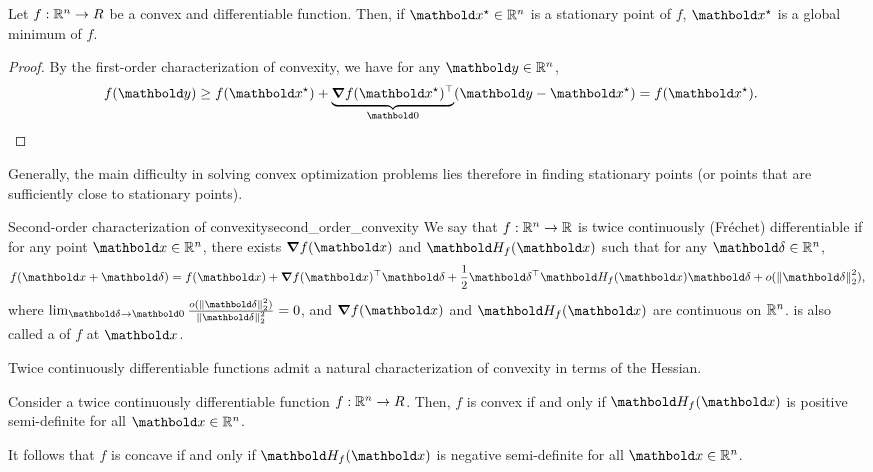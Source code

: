\begin{thmb}
  \begin{thm}
    Let $f : \mathbb{R}^n \to R$ be a convex and differentiable function.
    Then, if $\vxs \in \R^n$ is a stationary point of $f$, $\vxs$ is a global minimum of $f$.
  \end{thm}
\end{thmb}
\begin{proof}
  By the first-order characterization of convexity, we have for any $\vy \in \R^n$, \begin{align*}
    f(\vy) \geq f(\vxs) + \underbrace{\transpose{\grad f(\vxs)}}_{\vzero}(\vy - \vxs) = f(\vxs). &\qedhere
  \end{align*}
\end{proof}

Generally, the main difficulty in solving convex optimization problems lies therefore in finding stationary points (or points that are sufficiently close to stationary points).

\begin{rmk}{Second-order characterization of convexity}{second_order_convexity}
  We say that $f : \mathbb{R}^n \to \mathbb{R}$ is twice continuously (Fréchet) differentiable if for any point $\vx \in \R^n$, there exists $\grad f(\vx)$ and $\hes_f(\vx)$ such that for any $\vdelta \in \R^n$, \begin{align}
    f(\vx + \vdelta) = f(\vx) + \transpose{\grad f(\vx)}\vdelta + \frac{1}{2}\transpose{\vdelta}\hes_f(\vx)\vdelta + o(\norm{\vdelta}^2_2), \label{eq:second_order_exp}
  \end{align} where $\lim_{\vdelta \to \vzero} \frac{o(\norm{\vdelta}^2_2)}{\norm{\vdelta}^2_2} = 0$, and $\grad f(\vx)$ and $\hes_f(\vx)$ are continuous on $\mathbb{R}^n$.
   is also called a  of $f$ at $\vx$.

  Twice continuously differentiable functions admit a natural characterization of convexity in terms of the Hessian.

  \begin{fct}
    Consider a twice continuously differentiable function $f : \mathbb{R}^n \to R$. Then, $f$ is convex if and only if $\hes_f(\vx)$ is positive semi-definite for all $\vx \in \R^n$.
  \end{fct}

  It follows that $f$ is concave if and only if $\hes_f(\vx)$ is negative semi-definite for all $\vx \in \R^n$.
\end{rmk}

